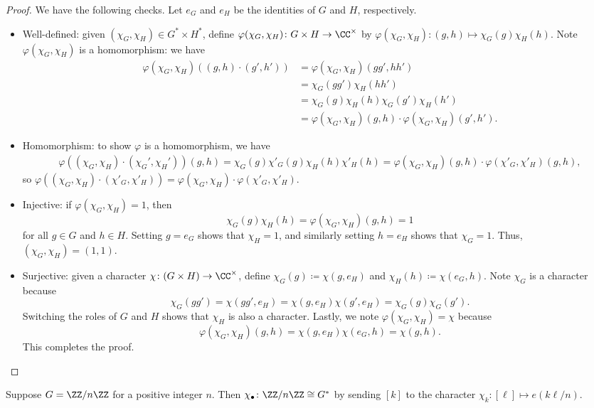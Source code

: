\documentclass[../notes.tex]{subfiles}
\begin{document}
\begin{proof}
	We have the following checks. Let $e_G$ and $e_H$ be the identities of $G$ and $H$, respectively.
	\begin{itemize}
		\item Well-defined: given $(\chi_G,\chi_H)\in G^*\times H^*$, define $\varphi(\chi_G,\chi_H)\colon G\times H\to\CC^\times$ by $\varphi(\chi_G,\chi_H)\colon(g,h)\mapsto\chi_G(g)\chi_H(h)$. Note $\varphi(\chi_G,\chi_H)$ is a homomorphism: we have
		\begin{align*}
			\varphi(\chi_G,\chi_H)((g,h)\cdot(g',h')) &= \varphi(\chi_G,\chi_H)(gg',hh') \\
			&= \chi_G(gg')\chi_H(hh') \\
			&= \chi_G(g)\chi_H(h)\chi_G(g')\chi_H(h') \\
			&=\varphi(\chi_G,\chi_H)(g,h)\cdot\varphi(\chi_G,\chi_H)(g',h').
		\end{align*}
		\item Homomorphism: to show $\varphi$ is a homomorphism, we have
		\begin{align*}
			\varphi((\chi_G,\chi_H)\cdot(\chi_G',\chi_H'))(g,h)=\chi_G(g)\chi'_G(g)\chi_H(h)\chi'_H(h)=\varphi(\chi_G,\chi_H)(g,h)\cdot\varphi(\chi'_G,\chi'_H)(g,h),
		\end{align*}
		so $\varphi((\chi_G,\chi_H)\cdot(\chi'_G,\chi'_H))=\varphi(\chi_G,\chi_H)\cdot\varphi(\chi'_G,\chi'_H)$.
		\item Injective: if $\varphi(\chi_G,\chi_H)=1$, then
		\[\chi_G(g)\chi_H(h)=\varphi(\chi_G,\chi_H)(g,h)=1\]
		for all $g\in G$ and $h\in H$. Setting $g=e_G$ shows that $\chi_H=1$, and similarly setting $h=e_H$ shows that $\chi_G=1$. Thus, $(\chi_G,\chi_H)=(1,1)$.
		\item Surjective: given a character $\chi\colon(G\times H)\to\CC^\times$, define $\chi_G(g)\coloneqq\chi(g,e_H)$ and $\chi_H(h)\coloneqq\chi(e_G,h)$. Note $\chi_G$ is a character because
		\[\chi_G(gg')=\chi(gg',e_H)=\chi(g,e_H)\chi(g',e_H)=\chi_G(g)\chi_G(g').\]
		Switching the roles of $G$ and $H$ shows that $\chi_H$ is also a character. Lastly, we note $\varphi(\chi_G,\chi_H)=\chi$ because
		\[\varphi(\chi_G,\chi_H)(g,h)=\chi(g,e_H)\chi(e_G,h)=\chi(g,h).\]
		This completes the proof.
		\qedhere
	\end{itemize}
\end{proof}
\begin{lemma} \label{lem:cyclic-dual}
	Suppose $G=\ZZ/n\ZZ$ for a positive integer $n$. Then $\chi_\bullet\colon\ZZ/n\ZZ\cong G^*$ by sending $[k]$ to the character $\chi_k\colon[\ell]\mapsto e(k\ell/n)$.
\end{lemma}
\end{document}
